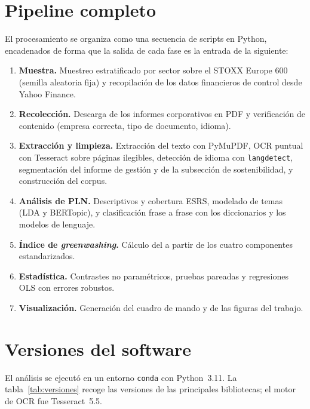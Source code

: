 \section*{Pipeline completo}

El procesamiento se organiza como una secuencia de scripts en Python, encadenados de forma que
la salida de cada fase es la entrada de la siguiente:

\begin{enumerate}
    \item \textbf{Muestra.} Muestreo estratificado por sector sobre el STOXX Europe 600 (semilla
    aleatoria fija) y recopilación de los datos financieros de control desde Yahoo Finance.
    \item \textbf{Recolección.} Descarga de los informes corporativos en PDF y verificación de
    contenido (empresa correcta, tipo de documento, idioma).
    \item \textbf{Extracción y limpieza.} Extracción del texto con PyMuPDF, OCR puntual con
    Tesseract sobre páginas ilegibles, detección de idioma con \texttt{langdetect}, segmentación
    del informe de gestión y de la subsección de sostenibilidad, y construcción del corpus.
    \item \textbf{Análisis de PLN.} Descriptivos y cobertura ESRS, modelado de temas (LDA y
    BERTopic), y clasificación frase a frase con los diccionarios y los modelos de lenguaje.
    \item \textbf{Índice de \textit{greenwashing}.} Cálculo del \gwindex{} a partir de los cuatro
    componentes estandarizados.
    \item \textbf{Estadística.} Contrastes no paramétricos, pruebas pareadas y regresiones OLS
    con errores robustos.
    \item \textbf{Visualización.} Generación del cuadro de mando y de las figuras del trabajo.
\end{enumerate}

\section*{Versiones del software}

El análisis se ejecutó en un entorno \texttt{conda} con Python~3.11. La
tabla~\ref{tab:versiones} recoge las versiones de las principales bibliotecas; el motor de OCR
fue Tesseract~5.5.

